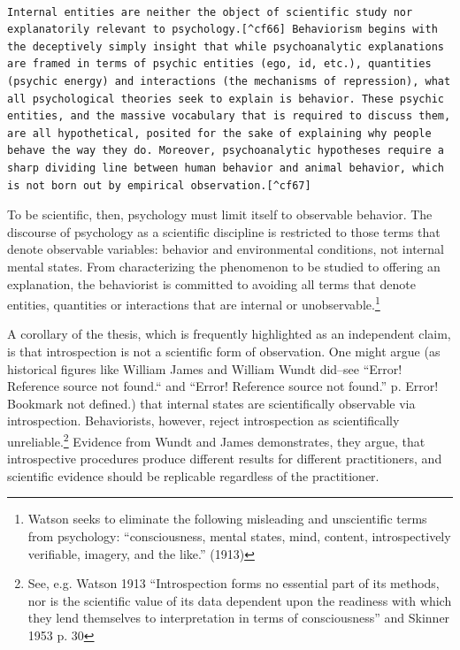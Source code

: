 \begin{adjustwidth}{2.5em}{2.5em}
\begin{verbatim}

Internal entities are neither the object of scientific study nor explanatorily relevant to psychology.[^cf66] Behaviorism begins with the deceptively simply insight that while psychoanalytic explanations are framed in terms of psychic entities (ego, id, etc.), quantities (psychic energy) and interactions (the mechanisms of repression), what all psychological theories seek to explain is behavior. These psychic entities, and the massive vocabulary that is required to discuss them, are all hypothetical, posited for the sake of explaining why people behave the way they do. Moreover, psychoanalytic hypotheses require a sharp dividing line between human behavior and animal behavior, which is not born out by empirical observation.[^cf67]

\end{verbatim}
\end{adjustwidth}

To be scientific, then, psychology must limit itself to observable behavior. The discourse of psychology as a scientific discipline is restricted to those terms that denote observable variables: behavior and environmental conditions, not internal mental states. From characterizing the phenomenon to be studied to offering an explanation, the behaviorist is committed to avoiding all terms that denote entities, quantities or interactions that are internal or unobservable.\footnote{Watson seeks to eliminate the following misleading and unscientific terms from psychology: “consciousness, mental states, mind, content, introspectively verifiable, imagery, and the like.” (1913)}

A corollary of the thesis, which is frequently highlighted as an independent claim, is that introspection is not a scientific form of observation. One might argue (as historical figures like William James and William Wundt did–see “Error! Reference source not found.“ and “Error! Reference source not found.” p. Error! Bookmark not defined.) that internal states are scientifically observable via introspection. Behaviorists, however, reject introspection as scientifically unreliable.\footnote{See, e.g. Watson 1913 “Introspection forms no essential part of its methods, nor is the scientific value of its data dependent upon the readiness with which they lend themselves to interpretation in terms of consciousness” and Skinner 1953 p. 30} Evidence from Wundt and James demonstrates, they argue, that introspective procedures produce different results for different practitioners, and scientific evidence should be replicable regardless of the practitioner.

